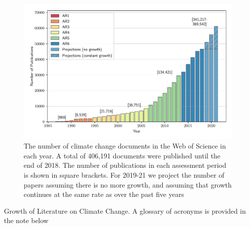 \documentclass{article}
\begin{document}
\begin{linenumbers}
		\begin{figure}[htp]
			\begin{center}
				\includegraphics[width=180mm]{../plots_pub/pubs_time_wgb.pdf}
				\caption{ The number of climate change documents in the Web of Science in each year. A total of 406,191 documents were published until the end of 2018. The number of publications in each assessment period is shown in square brackets. For 2019-21 we project the number of papers assuming there is no more growth, and assuming that growth continues at the same rate as over the past five years}
				\label{pub-growth}
			\end{center}
		\end{figure}
		
		
		\begin{table}[htp]
			\begin{center}
				{\scriptsize
					}
				\caption{Growth of Literature on Climate Change. A glossary of acronyms is provided in the note below}
				\label{tab}
			\end{center}
		\end{table}
	

\end{linenumbers}
\end{document}
